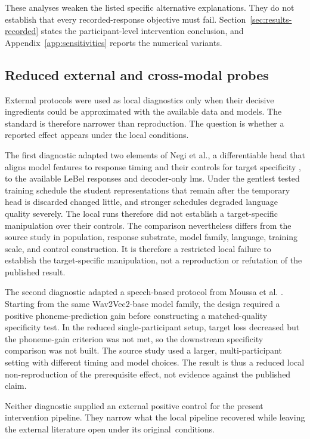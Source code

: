 These analyses weaken the listed specific alternative explanations.
They do not establish that every recorded-response objective must fail.
Section~\ref{sec:results-recorded} states the participant-level intervention conclusion, and Appendix~\ref{app:sensitivities} reports the numerical variants.

\subsection{Reduced external and cross-modal probes}

External protocols were used as local diagnostics only when their decisive ingredients could be approximated with the available data and models.
The standard is therefore narrower than reproduction.
The question is whether a reported effect appears under the local conditions.

The first diagnostic adapted two elements of Negi et al., a differentiable head that aligns model features to response timing and their controls for target specificity \autocite{negi2025}, to the available LeBel responses \autocite{lebel2023} and decoder-only \acp{lm}.
Under the gentlest tested training schedule the student representations that remain after the temporary head is discarded changed little, and stronger schedules degraded language quality severely.
The local runs therefore did not establish a target-specific manipulation over their controls.
The comparison nevertheless differs from the source study in population, response substrate, model family, language, training scale, and control construction.
It is therefore a restricted local failure to establish the target-specific manipulation, not a reproduction or refutation of the published result. 

The second diagnostic adapted a speech-based protocol from Moussa et al. \autocite{moussa2025}.
Starting from the same Wav2Vec2-base model family, the design required a positive phoneme-prediction gain before constructing a matched-quality specificity test.
In the reduced single-participant setup, target loss decreased but the phoneme-gain criterion was not met, so the downstream specificity comparison was not built.
The source study used a larger, multi-participant setting with different timing and model choices.
The result is thus a reduced local non-reproduction of the prerequisite effect, not evidence against the published claim. 

 Neither diagnostic supplied an external positive control for the present intervention pipeline.
They narrow what the local pipeline recovered while leaving the external literature open under its original~\mbox{conditions}.

